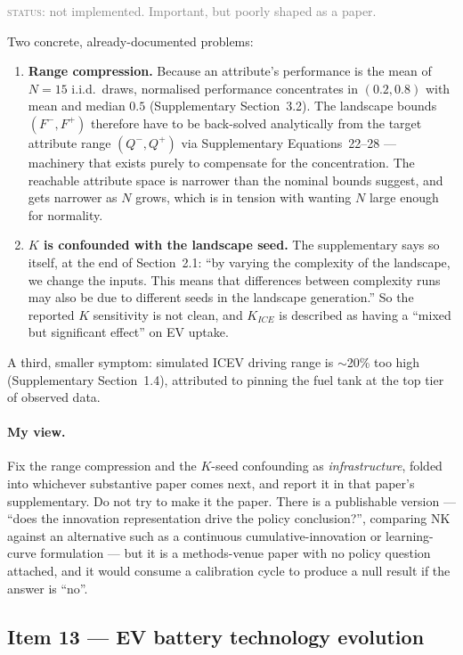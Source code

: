 \documentclass[11pt]{article}
\newcommand{\status}[1]{\textcolor{gray}{\textsc{status:} #1}}
\begin{document}
\status{not implemented. Important, but poorly shaped as a paper.}

Two concrete, already-documented problems:

\begin{enumerate}[leftmargin=1.5em]
\item \textbf{Range compression.} Because an attribute's performance is the
  mean of $N=15$ i.i.d.\ draws, normalised performance concentrates in
  $(0.2, 0.8)$ with mean and median $0.5$ (Supplementary Section~3.2). The
  landscape bounds $(F^-, F^+)$ therefore have to be back-solved
  analytically from the target attribute range $(Q^-, Q^+)$ via
  Supplementary Equations~22--28 --- machinery that exists purely to
  compensate for the concentration. The reachable attribute space is
  narrower than the nominal bounds suggest, and gets narrower as $N$ grows,
  which is in tension with wanting $N$ large enough for normality.
\item \textbf{$K$ is confounded with the landscape seed.} The supplementary
  says so itself, at the end of Section~2.1: ``by varying the complexity of
  the landscape, we change the inputs. This means that differences between
  complexity runs may also be due to different seeds in the landscape
  generation.'' So the reported $K$ sensitivity is not clean, and $K_{ICE}$
  is described as having a ``mixed but significant effect'' on EV uptake.
\end{enumerate}

A third, smaller symptom: simulated ICEV driving range is $\sim$20\% too
high (Supplementary Section~1.4), attributed to pinning the fuel tank at
the top tier of observed data.

\paragraph{My view.} Fix the range compression and the $K$-seed confounding
as \emph{infrastructure}, folded into whichever substantive paper comes
next, and report it in that paper's supplementary. Do not try to make it the
paper. There is a publishable version --- ``does the innovation
representation drive the policy conclusion?'', comparing NK against an
alternative such as a continuous cumulative-innovation or learning-curve
formulation --- but it is a methods-venue paper with no policy question
attached, and it would consume a calibration cycle to produce a null result
if the answer is ``no''.

\subsection{Item 13 --- EV battery technology evolution}
\end{document}
